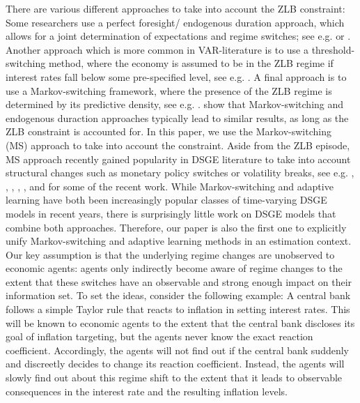 \documentclass[12pt,reqno]{article}
\numberwithin{equation}{section}
\begin{document}
\noindent
There are various different approaches to take into account the ZLB constraint: Some researchers use a perfect foresight/ endogenous duration approach, which allows for a joint determination of expectations and regime switches; see e.g. \cite{maih2015efficient} or \cite{linde2017estimation}. Another approach which is more common in VAR-literature is to use a threshold-switching method, where the economy is assumed to be in the ZLB regime if interest rates fall below some pre-specified level, see e.g. \cite{bonam2017effects}. A final approach is to use a Markov-switching framework, where the presence of the ZLB regime is determined by its predictive density, see e.g. \cite{binning2016implementing}. \cite{linde2017estimation} show that Markov-switching and endogenous duraction approaches typically lead to similar results, as long as the ZLB constraint is accounted for. In this paper, we use the Markov-switching (MS) approach to take into account the constraint. Aside from the ZLB episode, MS approach recently gained popularity in DSGE literature to take into account structural changes such as monetary policy switches or volatility breaks, see e.g. \cite{sims2006were}, \cite{davig2007generalizing}, \cite{sims2008methods}, \cite{liu2011sources}, \cite{liu2011evolving}, \cite{bianchi2016methods} and \cite{bianchi2017monetary} for some of the recent work. While Markov-switching and adaptive learning have both been increasingly popular classes of time-varying DSGE models in recent years, there is surprisingly little work on DSGE models that combine both approaches. Therefore, our paper is also the first one to explicitly unify Markov-switching and adaptive learning methods in an estimation context. \\

\noindent
Our key assumption is that  the underlying regime changes are unobserved to economic agents: agents only indirectly become aware of regime changes to the extent that these switches have an observable and strong enough impact on their information set. To set the ideas, consider the following example: A central bank follows a simple Taylor rule that reacts to inflation in setting interest rates. This will be known to economic agents to the extent that the central bank discloses its goal of inflation targeting, but the agents never know the exact reaction coefficient. Accordingly, the agents will not find out if the central bank suddenly and discreetly decides to change its reaction coefficient. Instead, the agents will slowly find out about this regime shift to the extent that it leads to observable consequences in the interest rate and the resulting inflation levels. \\
\end{document}
